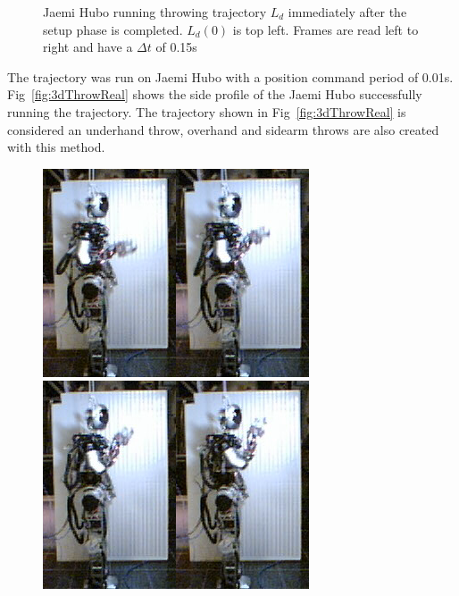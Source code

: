 \begin{figure}[thpb]
  \caption{Jaemi Hubo running throwing trajectory $L_d$ immediately after the setup phase is completed.  $L_d(0)$ is top left.  Frames are read left to right and have a $\Delta t$ of 0.15s}
  \label{fig:thrwTraj}
\end{figure}



The trajectory was run on Jaemi Hubo with a position command period of 0.01s.  Fig~\ref{fig:3dThrowReal} shows the side profile of the Jaemi Hubo successfully running the trajectory.  The trajectory shown in Fig~\ref{fig:3dThrowReal} is considered an underhand throw, overhand and sidearm throws are also created with this method.

\begin{figure}[thpb]
  \centering
\includegraphics[width=0.25\columnwidth]{./pictures/slowMotion/1.png}\includegraphics[width=0.25\columnwidth]{./pictures/slowMotion/2.png}\includegraphics[width=0.25\columnwidth]{./pictures/slowMotion/3.png}\includegraphics[width=0.25\columnwidth]{./pictures/slowMotion/4.png}

\end{figure}
